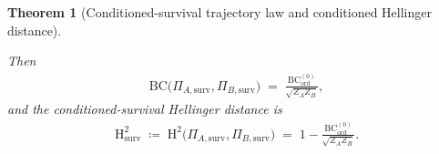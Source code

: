 \documentclass[twoside]{article}
\newcommand{\1}{\mathbf{1}}
\newtheorem{theorem}{Theorem}
\begin{document}
\begin{theorem}[Conditioned-survival trajectory law and conditioned Hellinger distance]
\begin{enumerate}
        Then
        \begin{align}\label{eq:conditioned-bc-posthoc}
            \mathrm{BC}\!\bigl(\Pi_{A,\mathrm{surv}}, \Pi_{B,\mathrm{surv}}\bigr)
            \;=\;
            \frac{\mathrm{BC}_{\mathrm{ord}}^{(0)}}{\sqrt{Z_A Z_B}},
        \end{align}
        and the conditioned-survival Hellinger distance is
        \begin{align}\label{eq:conditioned-h2}
            \mathrm{H}_{\mathrm{surv}}^2
            \;\coloneqq\;
            \mathrm{H}^2\!\bigl(\Pi_{A,\mathrm{surv}}, \Pi_{B,\mathrm{surv}}\bigr)
            \;=\;
            1 - \frac{\mathrm{BC}_{\mathrm{ord}}^{(0)}}{\sqrt{Z_A Z_B}}.
        \end{align}
\end{enumerate}
\end{theorem}
\end{document}
